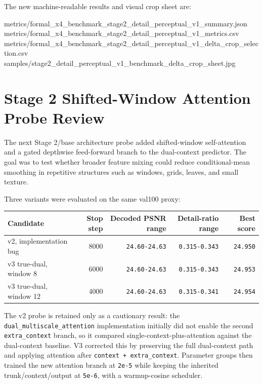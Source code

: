 \documentclass[
  10pt,
]{article}
\newenvironment{Shaded}{}{}
\newcommand{\NormalTok}[1]{#1}
\begin{document}
The new machine-readable results and visual crop sheet are:

\begin{Shaded}
\begin{Highlighting}[]
\NormalTok{metrics/formal\_x4\_benchmark\_stage2\_detail\_perceptual\_v1\_summary.json}
\NormalTok{metrics/formal\_x4\_benchmark\_stage2\_detail\_perceptual\_v1\_metrics.csv}
\NormalTok{metrics/formal\_x4\_benchmark\_stage2\_detail\_perceptual\_v1\_delta\_crop\_selection.csv}
\NormalTok{samples/stage2\_detail\_perceptual\_v1\_benchmark\_delta\_crop\_sheet.jpg}
\end{Highlighting}
\end{Shaded}

\hypertarget{stage-2-shifted-window-attention-probe-review}{%
\section{Stage 2 Shifted-Window Attention Probe
Review}\label{stage-2-shifted-window-attention-probe-review}}

The next Stage 2/base architecture probe added shifted-window
self-attention and a gated depthwise feed-forward branch to the
dual-context predictor. The goal was to test whether broader feature
mixing could reduce conditional-mean smoothing in repetitive structures
such as windows, grids, leaves, and small texture.

Three variants were evaluated on the same val100 proxy:

\begin{longtable}[]{@{}lrrrr@{}}
\toprule\noalign{}
Candidate & Stop step & Decoded PSNR range & Detail-ratio range & Best
score \\
\midrule\noalign{}
\endhead
\bottomrule\noalign{}
\endlastfoot
v2, implementation bug & 8000 & \texttt{24.60-24.63} &
\texttt{0.315-0.343} & \texttt{24.950} \\
v3 true-dual, window 8 & 6000 & \texttt{24.60-24.63} &
\texttt{0.315-0.343} & \texttt{24.953} \\
v3 true-dual, window 12 & 4000 & \texttt{24.60-24.63} &
\texttt{0.315-0.341} & \texttt{24.954} \\
\end{longtable}

The v2 probe is retained only as a cautionary result: the
\texttt{dual\_multiscale\_attention} implementation initially did not
enable the second \texttt{extra\_context} branch, so it compared
single-context-plus-attention against the dual-context baseline. V3
corrected this by preserving the full dual-context path and applying
attention after \texttt{context\ +\ extra\_context}. Parameter groups
then trained the new attention branch at \texttt{2e-5} while keeping the
inherited trunk/context/output at \texttt{5e-6}, with a warmup-cosine
scheduler.
\end{document}
